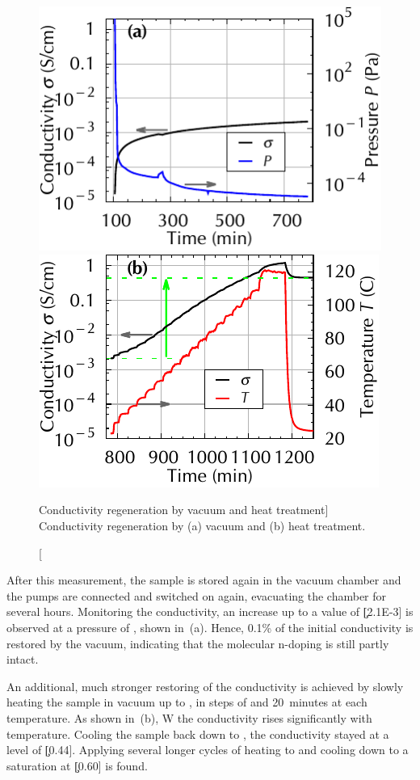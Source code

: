 %
\begin{figure}[b]
\centering
\includegraphics{plot/killing+reanimating-C60-2-evap}%
\hfill
\includegraphics{plot/killing+reanimating-C60-3-heat}%
\setcapwidth[c]{\tmCapWidth}%
\caption
[Conductivity regeneration by vacuum and \insitu heat treatment]
{Conductivity regeneration by (a) vacuum and (b) \insitu heat treatment.}
\label{fig:killing+reanimating-C60-2+2}
\end{figure}
%
After this measurement, the sample is stored again in the vacuum chamber and the pumps are connected and switched on again, evacuating the chamber for several hours. Monitoring the conductivity, an increase up to a value of \c[2.1E-3] is observed at a pressure of , shown in \,(a).
Hence, 0.1\% of the initial conductivity is restored by the vacuum, indicating that the molecular n-doping is still partly intact.

An additional, much stronger restoring of the conductivity is achieved by slowly heating the sample in vacuum up to , in steps of  and 20~minutes at each temperature. As shown in \,(b), W
the conductivity rises significantly with temperature. Cooling the sample back down to , the conductivity stayed at a level of \c[0.44]. Applying several longer cycles of heating to  and cooling down to  a saturation at \c[0.60] is found.

